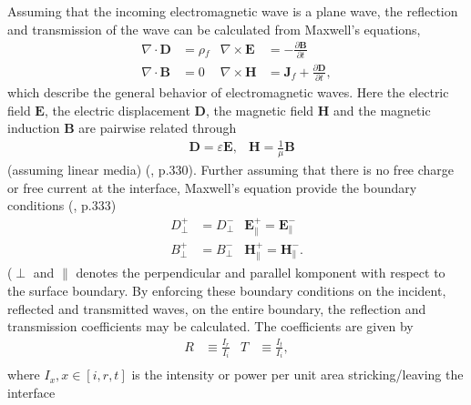 Assuming that the incoming electromagnetic wave is a plane wave, the reflection and transmission
of the wave can be calculated from Maxwell's equations,
%
\begin{subequations}
\label{ME}
\begin{align}
   \nabla \cdot \boldsymbol{D} &= \rho \!_f           &\nabla\times\boldsymbol{E} &= - \frac{\partial \boldsymbol{B}}{\partial t} \label{ME1}\\
   \nabla \cdot \boldsymbol{B} &= 0                &\nabla \times \boldsymbol{H}&= \boldsymbol{J}\!_f + \frac{\partial \boldsymbol{D}}{\partial t}, \label{ME2}
\end{align}
\end{subequations}
%
which describe the general behavior of electromagnetic waves.
Here the electric field $\boldsymbol{E}$, the electric displacement $\boldsymbol{D}$,
the magnetic field $\boldsymbol{H}$ and the magnetic induction $\boldsymbol{B}$
are pairwise related through
\begin{align}
   \label{linearConstitutiveRelations}
   &\boldsymbol{D} = \varepsilon \boldsymbol{E},         &\boldsymbol{H} = \frac{1}{\mu} \boldsymbol{B}
\end{align}
(assuming linear media) (\cite{Griffiths}, p.330). 
Further assuming that there
is no free charge or free current at the interface, Maxwell's equation provide the boundary conditions 
(\cite{Griffiths}, p.333)
%
\begin{subequations}
\label{BC}
\begin{align}
   D^+_{\perp} &= D^-_{\perp}      &\boldsymbol{E}^+_{\parallel} = \boldsymbol{E}^-_{\parallel} \label{BC1}\\
   B^+_{\perp} &= B^-_{\perp}      &\boldsymbol{H}^+_{\parallel} = \boldsymbol{H}^-_{\parallel}. \label{BC2}
\end{align}
\end{subequations}
%
($\perp$ and $\parallel$ denotes the perpendicular and parallel komponent with respect to the 
surface boundary. By enforcing these boundary conditions on the incident, reflected and transmitted 
waves, on the entire boundary, the reflection and transmission coefficients may be calculated. The 
coefficients are given by
\begin{align}
   R &\equiv \frac{I_r}{I_i}     &T &\equiv \frac{I_t}{I_i}, \label{refTransCoeffs1}\\
\end{align}
where $I_x, x \in [i,r,t]$ is the intensity or power per unit area stricking/leaving the interface
